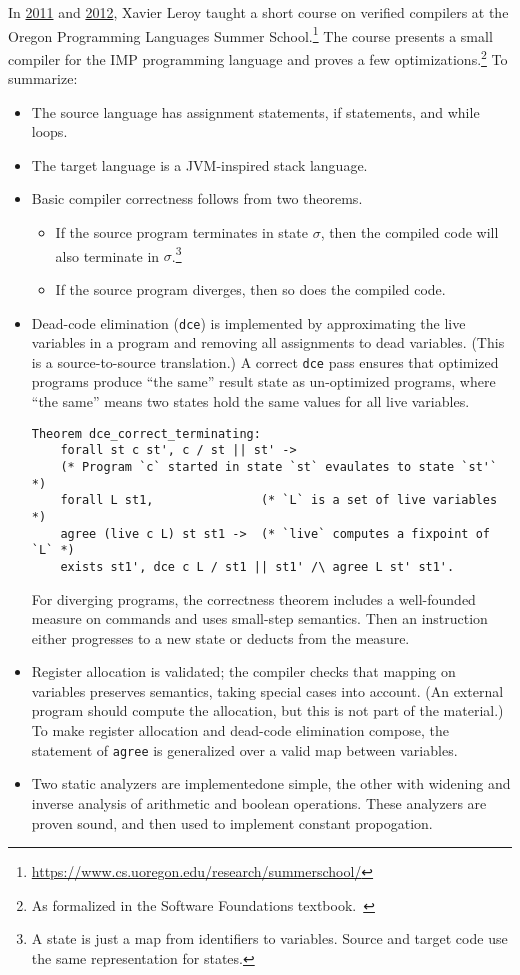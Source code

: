 In \href{http://gallium.inria.fr/~xleroy/courses/Eugene-2011/}{2011}
 and \href{http://gallium.inria.fr/~xleroy/courses/Eugene-2012/}{2012},
 Xavier Leroy taught a short course on verified compilers at the Oregon Programming Languages Summer School.\footnote{\url{https://www.cs.uoregon.edu/research/summerschool/}}
The course presents a small compiler for the IMP programming language and proves a few optimizations.\footnote{As formalized in the Software Foundations textbook.~\cite{pcgghsy-software}}
To summarize:
\begin{itemize}
\item
  The source language has assignment statements, if statements, and while loops.
\item
  The target language is a JVM-inspired stack language.
\item
  Basic compiler correctness follows from two theorems.
  \begin{itemize}
  \item If the source program terminates in state $\sigma$, then the compiled code will also terminate in $\sigma$.\footnote{A state is just a map from identifiers to variables. Source and target code use the same representation for states.}
    
  \item If the source program diverges, then so does the compiled code.
  \end{itemize}
\item
  Dead-code elimination ({\tt dce}) is implemented by approximating the live variables in a program and removing all assignments to dead variables.
  (This is a source-to-source translation.)
  A correct {\tt dce} pass ensures that optimized programs produce ``the same'' result state as un-optimized programs, where ``the same'' means two states hold the same values for all live variables.
  \begin{lstlisting}[style=Coq]
  Theorem dce_correct_terminating:
    forall st c st', c / st || st' ->
    (* Program `c` started in state `st` evaulates to state `st'` *)
    forall L st1,               (* `L` is a set of live variables *)
    agree (live c L) st st1 ->  (* `live` computes a fixpoint of `L` *)
    exists st1', dce c L / st1 || st1' /\ agree L st' st1'.
  \end{lstlisting}
  For diverging programs, the correctness theorem includes a well-founded measure on commands and uses small-step semantics.
  Then an instruction either progresses to a new state or deducts from the measure.
\item
  Register allocation is validated; the compiler checks that mapping on variables preserves semantics, taking special cases into account.
  (An external program should compute the allocation, but this is not part of the material.)
  To make register allocation and dead-code elimination compose, the statement of {\tt agree} is generalized over a valid map between variables.
\item
  Two static analyzers are implemented\textemdash one simple, the other with widening and inverse analysis of arithmetic and boolean operations.
  These analyzers are proven sound, and then used to implement constant propogation.
\end{itemize}
